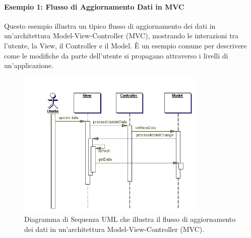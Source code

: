 \paragraph{Esempio 1: Flusso di Aggiornamento Dati in MVC}
Questo esempio illustra un tipico flusso di aggiornamento dei dati in un'architettura Model-View-Controller (MVC), mostrando le interazioni tra l'utente, la View, il Controller e il Model. È un esempio comune per descrivere come le modifiche da parte dell'utente si propagano attraverso i livelli di un'applicazione.
\begin{figure}[h!]
    \centering
    \includegraphics[width=0.8\textwidth]{immagini/uml_sequence_mvc_update.png} %
    \caption{Diagramma di Sequenza UML che illustra il flusso di aggiornamento dei dati in un'architettura Model-View-Controller (MVC).}
    \label{fig:diagramma_sequenza_mvc_update}
\end{figure}

